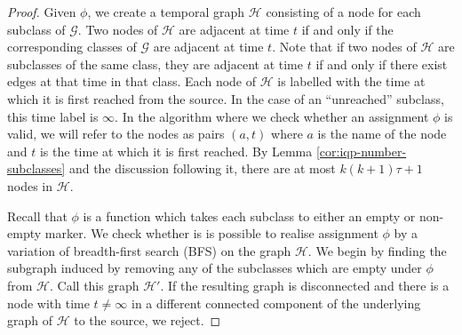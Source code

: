 \documentclass[preprint,12pt]{elsarticle}
\begin{document}
\begin{proof}
    Given $\phi$, we create a temporal graph $\mathcal{H}$ consisting of a node for each subclass of $\mathcal{G}$. Two nodes of $\mathcal{H}$ are adjacent at time $t$ if and only if the corresponding classes of $\mathcal{G}$ are adjacent at time $t$. Note that if two nodes of $\mathcal{H}$ are subclasses of the same class, they are adjacent at time $t$ if and only if there exist edges at that time in that class. Each node of $\mathcal{H}$ is labelled with the time at which it is first reached from the source. In the case of an ``unreached'' subclass, this time label is $\infty$. In the algorithm where we check whether an assignment $\phi$ is valid, we will refer to the nodes as pairs $(a,t)$ where $a$ is the name of the node and $t$ is the time at which it is first reached. By Lemma \ref{cor:iqp-number-subclasses} and the discussion following it, there are at most $k(k+1)\tau+1$ nodes in $\mathcal{H}$.
    
    Recall that $\phi$ is a function which takes each subclass to either an empty or non-empty marker. We check whether is is possible to realise assignment $\phi$ by a variation of breadth-first search (BFS) on the graph $\mathcal{H}$. We begin by finding the subgraph induced by removing any of the subclasses which are empty under $\phi$ from $\mathcal{H}$. Call this graph $\mathcal{H}'$. If the resulting graph is disconnected and there is a node with time $t\neq\infty$ in a different connected component of the underlying graph of $\mathcal{H}$ to the source, we reject. 


\end{proof}
\end{document}

